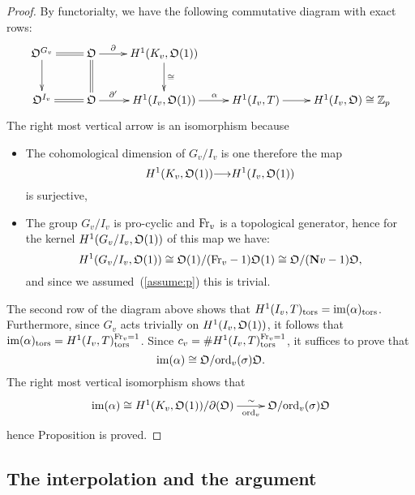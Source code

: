 \documentclass[12pt]{amsart}
\numberwithin{equation}{section}
\begin{document}
 \begin{proof}
 By functorialty, we have the following commutative diagram with exact rows:
$$\xymatrix{\frak{O}^{G_v}\ar[d]\ar@{=}[r]&\frak{O}\ar@{=}[d] \ar[r]^(.3){\partial} &H^1(K_v,\frak{O}(1))\ar[d]^{\cong} &&\\
\frak{O}^{I_v}\ar@{=}[r]&\frak{O} \ar[r]^(.3){\partial^\prime} & H^1(I_v,\frak{O}(1)) \ar[r]^(.55){\alpha} &H^1(I_v,T) \ar[r]& H^1(I_v, \frak{O})\cong{\mathbb{Z}}_p
}
$$
The right most vertical arrow is an isomorphism because
\begin{itemize}
\item The cohomological dimension of $G_v/I_v$ is one therefore the map
$$H^1(K_v,\frak{O}(1)) {\longrightarrow} H^1(I_v,\frak{O}(1))$$
is surjective,
\item The group $G_v/I_v$ is pro-cyclic and $\textup{Fr}_v$ is a topological generator, hence for the kernel $H^1(G_v/I_v,\frak{O}(1))$ of this map we have:
$$H^1(G_v/I_v,\frak{O}(1))\cong \frak{O}(1)/(\textup{Fr}_v-1)\frak{O}(1)\cong \frak{O}/(\mathbf{N}v-1)\frak{O},$$
 and since we assumed~(\ref{assume:p}) this is trivial.
\end{itemize}

The second row of the diagram above shows that $H^1(I_v,T)_{\textup{tors}}=\textup{im}(\alpha)_{\textup{tors}}$. Furthermore, since $G_v$ acts trivially on $H^1(I_v,\frak{O}(1))$, it follows that  $\textup{im}(\alpha)_{\textup{tors}}=H^1(I_v,T)_{\textup{tors}}^{\textup{Fr}_v=1}$. Since $c_v=\#H^1(I_v,T)_{\textup{tors}}^{\textup{Fr}_v=1} $, it suffices to prove that 
$$\textup{im}(\alpha)\cong \frak{O}/{\textup{ord}}_v(\sigma)\frak{O}.$$
 The right most vertical isomorphism shows that 
 $$\xymatrix{\textup{im}(\alpha)\cong H^1(K_v,\frak{O}(1))/\partial(\frak{O})\ar[r]_(.65){{\textup{ord}}_v}^(.65){\sim}& \frak{O}/{\textup{ord}}_v(\sigma)\frak{O}}$$
  hence Proposition is proved.

 \end{proof}

 \subsection{The interpolation and the argument}
\end{document}
